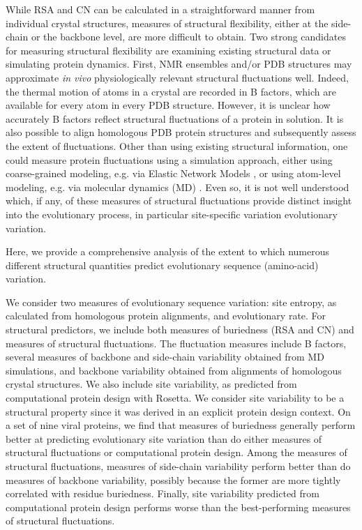 \documentclass[smallextended]{svjour3}
\begin{document}
While RSA and CN can be calculated in a straightforward manner from individual crystal structures, measures of structural flexibility, either at the side-chain or the backbone level, are more difficult to obtain. Two strong candidates for measuring structural flexibility are examining existing structural data or simulating protein dynamics. First, NMR ensembles and/or PDB structures may approximate \emph{in vivo} physiologically relevant structural fluctuations well. Indeed, the thermal motion of atoms in a crystal are recorded in B factors, which are available for every atom in every PDB structure. However, it is unclear how accurately B factors reflect structural fluctuations of a protein in solution. It is also possible to align homologous PDB protein structures and subsequently assess the extent of fluctuations. Other than using existing structural information, one could measure protein fluctuations using a simulation approach, either using coarse-grained modeling, e.g. via Elastic Network Models \citep{Sanejouand2013}, or using atom-level modeling, e.g. via molecular dynamics (MD) \citep{KarplusMcCammon2002}. Even so, it is not well understood which, if any, of these measures of structural fluctuations provide distinct insight into the evolutionary process, in particular site-specific variation evolutionary variation.

Here, we provide a comprehensive analysis of the extent to which numerous different structural quantities predict evolutionary sequence (amino-acid) variation. 

 We consider two measures of evolutionary sequence variation: site entropy, as calculated from homologous protein alignments, and evolutionary rate. For structural predictors, we include both measures of buriedness (RSA and CN) and measures of structural fluctuations. The fluctuation measures include B factors, several measures of backbone and side-chain variability obtained from MD simulations, and backbone variability obtained from alignments of homologous crystal structures. We also include site variability, as predicted from computational protein design with Rosetta. We consider site variability to be a structural property since it was derived in an explicit protein design context. On a set of nine viral proteins, we find that measures of buriedness generally perform better at predicting evolutionary site variation than do either measures of structural fluctuations or computational protein design. Among the measures of structural fluctuations, measures of side-chain variability perform better than do measures of backbone variability, possibly because the former are more tightly correlated with residue buriedness. Finally, site variability predicted from computational protein design performs worse than the best-performing measures of structural fluctuations.
\end{document}
